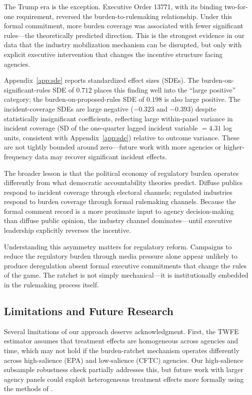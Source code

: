 \documentclass[12pt]{article}
\begin{document}
The Trump era is the exception. Executive Order 13771, with its binding two-for-one requirement, reversed the burden-to-rulemaking relationship. Under this formal commitment, more burden coverage was associated with fewer significant rules---the theoretically predicted direction. This is the strongest evidence in our data that the industry mobilization mechanism can be disrupted, but only with explicit executive intervention that changes the incentive structure facing agencies.

Appendix~\ref{app:sde} reports standardized effect sizes (SDEs). The burden-on-significant-rules SDE of $0.712$ places this finding well into the ``large positive'' category; the burden-on-proposed-rules SDE of $0.198$ is also large positive. The incident-coverage SDEs are large negative ($-0.323$ and $-0.393$) despite statistically insignificant coefficients, reflecting large within-panel variance in incident coverage (SD of the one-quarter lagged incident variable $= 4.31$ log units, consistent with Appendix~\ref{app:sde}) relative to outcome variance. These are not tightly bounded around zero---future work with more agencies or higher-frequency data may recover significant incident effects.

The broader lesson is that the political economy of regulatory burden operates differently from what democratic accountability theories predict. Diffuse publics respond to incident coverage through electoral channels; regulated industries respond to burden coverage through formal rulemaking channels. Because the formal comment record is a more proximate input to agency decision-making than diffuse public opinion, the industry channel dominates---until executive leadership explicitly reverses the incentive.

Understanding this asymmetry matters for regulatory reform. Campaigns to reduce the regulatory burden through media pressure alone appear unlikely to produce deregulation absent formal executive commitments that change the rules of the game. The ratchet is not simply mechanical---it is institutionally embedded in the rulemaking process itself.

\subsection{Limitations and Future Research}

Several limitations of our approach deserve acknowledgment. First, the TWFE estimator assumes that treatment effects are homogeneous across agencies and time, which may not hold if the burden-ratchet mechanism operates differently across high-salience (EPA) and low-salience (CFTC) agencies. Our high-salience subsample robustness check partially addresses this, but future work with larger agency panels could exploit heterogeneous treatment effects more formally using the methods of \citet{callaway2021did}.
\end{document}

